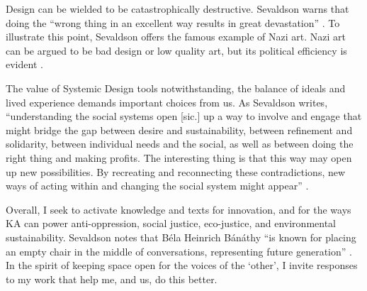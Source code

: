 Design can be wielded to be catastrophically destructive. Sevaldson warns that doing the ``wrong thing in an excellent way results in great devastation” \citep[p. 87]{sevaldson_designing_2022}. To illustrate this point, Sevaldson offers the famous example of Nazi art. Nazi art can be argued to be bad design or low quality art, but its political efficiency is evident \citep[p. 87]{sevaldson_designing_2022}. 

The value of Systemic Design tools notwithstanding, the balance of ideals and lived experience demands important choices from us. As Sevaldson writes, ``understanding the social systems open [sic.] up a way to involve and engage that might bridge the gap between desire and sustainability, between refinement and solidarity, between individual needs and the social, as well as between doing the right thing and making profits. The interesting thing is that this way may open up new possibilities. By recreating and reconnecting these contradictions, new ways of acting within and changing the social system might appear” \citep[p. 42-43]{sevaldson_designing_2022}. 

Overall, I seek to activate knowledge and texts for innovation, and for the ways KA can power anti-oppression, social justice, eco-justice, and environmental sustainability. Sevaldson notes that Béla Heinrich Bánáthy ``is known for placing an empty chair in the middle of conversations, representing future generation” \citep[p. 97]{sevaldson_designing_2022}. In the spirit of keeping space open for the voices of the `other’, I invite responses to my work that help me, and us, do this better. 
 
